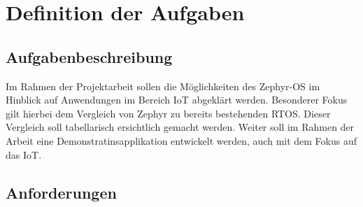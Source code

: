 \chapter{Definition der Aufgaben}
\label{chap:aufgaben}

\section{Aufgabenbeschreibung}
Im Rahmen der Projektarbeit sollen die Möglichkeiten des Zephyr-OS im Hinblick auf Anwendungen im Bereich \ac{IoT} abgeklärt werden. Besonderer Fokus gilt hierbei dem Vergleich von Zephyr zu bereits bestehenden \ac{RTOS}. Dieser Vergleich soll tabellarisch ersichtlich gemacht werden. Weiter soll im Rahmen der Arbeit eine Demonstratinsapplikation entwickelt werden, auch mit dem Fokus auf das \ac{IoT}.

\section{Anforderungen}


